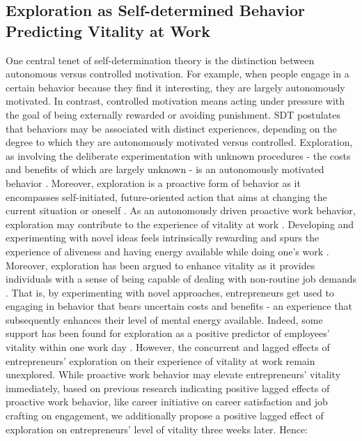 \documentclass[man, 12pt, a4paper, noextraspace]{apa6}
\begin{document}
\subsection{Exploration as Self-determined Behavior Predicting Vitality at Work}

One central tenet of self-determination theory \parencite[SDT]{Ryan.2001} is the distinction between autonomous versus controlled motivation. 
For example, when people engage in a certain behavior because they find it interesting, they are largely autonomously motivated. 
In contrast, controlled motivation means acting under pressure with the goal of being externally rewarded or avoiding punishment. 
SDT postulates that behaviors may be associated with distinct experiences, depending on the degree to which they are autonomously motivated versus controlled.
Exploration, as involving the deliberate experimentation with unknown procedures - the costs and benefits of which are largely unknown - is an autonomously motivated behavior \parencite{Ryan.1997}.
Moreover, exploration is a proactive form of behavior as it encompasses self-initiated, future-oriented action that aims at changing the current situation or oneself \parencite{Crant.2000}. 
As an autonomously driven proactive work behavior, exploration may contribute to the experience of vitality at work \parencite{Ryan.1997}.
Developing and experimenting with novel ideas feels intrinsically rewarding and spurs the experience of aliveness and having energy available while doing one's work \parencite{Spreitzer.2005b}.
Moreover, exploration has been argued to enhance vitality as it provides individuals with a sense of being capable of dealing with non-routine job demands \parencite{Daniels2009, Niessen.2012}.
That is, by experimenting with novel approaches, entrepreneurs get used to engaging in behavior that bears uncertain costs and benefits - an experience that subsequently enhances their level of mental energy available. 
Indeed, some support has been found for exploration as a positive predictor of employees' vitality within one work day \textcite{Niessen.2012}.
However, the concurrent and lagged effects of entrepreneurs' exploration on their experience of vitality at work remain unexplored. 
While proactive work behavior may elevate entrepreneurs' vitality immediately, based on previous research indicating positive lagged effects of proactive work behavior, like career initiative on career satisfaction \parencite[e.g.,]{Seibert.2001} and job crafting on engagement, we additionally propose a positive lagged effect of exploration on entrepreneurs' level of vitality three weeks later. 
Hence: \par 
\end{document}
